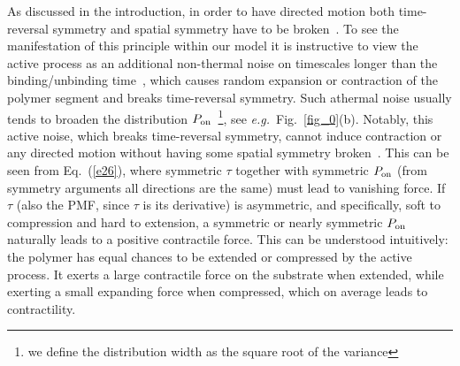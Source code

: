 \documentclass[twocolumn,prl,english]{revtex4-1}
\begin{document}
As discussed in the introduction, in order to have directed motion both time-reversal symmetry and spatial symmetry have to be broken~\cite{Feynman1963, Magnasco1993, Magnasco1994}. To see the manifestation of this principle within our model it is instructive to view the active process as an additional non-thermal noise on timescales longer than the binding/unbinding time~\cite{MacKintosh2008,Gladrow2016,Mura2018}, which causes random expansion or contraction of the polymer segment and breaks time-reversal symmetry. Such athermal noise usually tends to broaden the distribution $P_{\rm on}$~\footnote{\label{note1}we define the distribution width as the square root of the variance}, see  {\it e.g.}~Fig.~\ref{fig_0}(b). Notably, this active noise, which breaks time-reversal symmetry, cannot induce contraction or any directed motion without having some spatial symmetry broken~\cite{Feynman1963}. This can be seen from Eq.~(\ref{e26}), where symmetric $\tau$ together with symmetric $P_{\rm on}$   (from symmetry arguments all directions are the same) must lead to vanishing force. If $\tau$ (also the PMF, since $\tau$ is its derivative) is asymmetric, and specifically, soft to compression and hard to  extension, a symmetric or nearly symmetric $P_{\rm on}$ naturally leads to a positive contractile force. This can be understood intuitively: the polymer has equal chances to be extended or compressed by the active process. It exerts a large contractile force on the substrate when extended, while exerting a small expanding force when compressed, which on average leads to contractility. 
\end{document}

